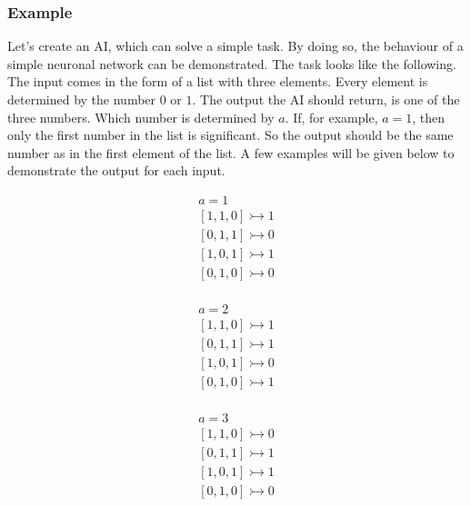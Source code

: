 \documentclass[12pt]{article}
\begin{document}
\subsubsection{Example}
Let's create an \gls{AI}, which can solve a simple task.\cite{NN_example} By doing so, the behaviour of a simple \gls{neuronal network} can be demonstrated. The task looks like the following. The input comes in the form of a list with three elements. Every element is determined by the number $0$ or $1$. The output the \gls{AI} should return, is one of the three numbers. Which number is determined by $a$. If, for example,  $a = 1$, then only the first number in the list is significant. So the output should be the same number as in the first element of the list. A few examples will be given below to demonstrate the output for each input.\\
\begin{minipage}{0.3\textwidth}
  \begin{align*}
    a = 1\\
\left [ 1,1,0 \right ] \rightarrowtail 1\\
\left [ 0,1,1 \right ] \rightarrowtail 0\\
\left [ 1,0,1 \right ] \rightarrowtail 1\\
\left [ 0,1,0 \right ] \rightarrowtail 0\\
  \end{align*} 
\end{minipage}
\begin{minipage}{0.3\textwidth}
  \begin{align*}
     a = 2\\
\left [ 1,1,0 \right ] \rightarrowtail 1\\
\left [ 0,1,1 \right ] \rightarrowtail 1\\
\left [ 1,0,1 \right ] \rightarrowtail 0\\
\left [ 0,1,0 \right ] \rightarrowtail 1\\
  \end{align*}
\end{minipage}
\begin{minipage}{0.3\textwidth}
  \begin{align*}
     a = 3\\
\left [ 1,1,0 \right ] \rightarrowtail 0\\
\left [ 0,1,1 \right ] \rightarrowtail 1\\
\left [ 1,0,1 \right ] \rightarrowtail 1\\
\left [ 0,1,0 \right ] \rightarrowtail 0\\
  \end{align*}
\end{minipage}\\
\end{document}
